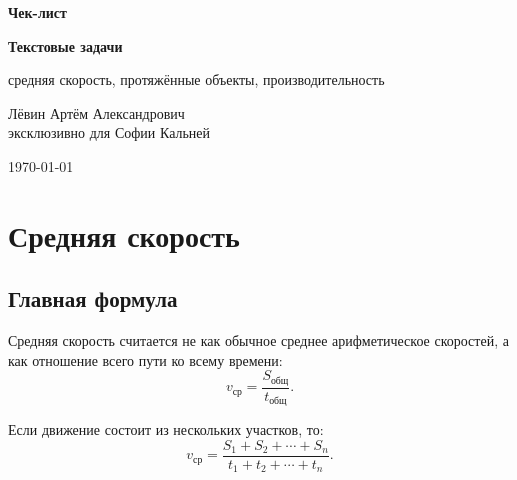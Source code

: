 \documentclass[a4paper,12pt]{article}
\begin{document}
\begin{titlepage}
\thispagestyle{empty}
\begin{center}
\vspace*{25mm}

{\Large \textcolor{accent}{\textbf{Чек-лист}}}

\vspace{8mm}

{\Huge \textbf{Текстовые задачи}}

\vspace{4mm}

{\Large средняя скорость, протяжённые объекты, производительность}

\vspace{22mm}

{\large Лёвин Артём Александрович\\[1mm]
эксклюзивно для Софии Кальней}

\vspace{12mm}

{\large \today}

\vfill


\vspace{8mm}
\end{center}
\end{titlepage}

\tableofcontents
\newpage

\section{Средняя скорость}

\subsection{Главная формула}

Средняя скорость считается не как обычное среднее арифметическое скоростей, а как отношение всего пути ко всему времени:
\[
v_{\text{ср}}=\frac{S_{\text{общ}}}{t_{\text{общ}}}.
\]

Если движение состоит из нескольких участков, то:
\[
v_{\text{ср}}=\frac{S_1+S_2+\cdots+S_n}{t_1+t_2+\cdots+t_n}.
\]
\end{document}

